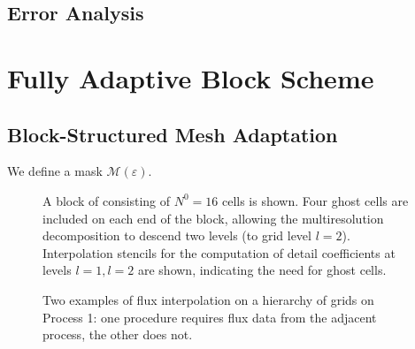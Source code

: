 \documentclass[]{article}
\begin{document}
    \subsection*{Error Analysis}

\section{Fully Adaptive Block Scheme}


    \subsection*{Block-Structured Mesh Adaptation}
    We define a mask $\bm{\mathcal{M}}(\varepsilon)$.

    \begin{figure}[H]
        \center
        
        \caption{A block of consisting of $N^{0} = 16$ cells is shown. Four
        ghost cells are included on each end of the block, allowing the
        multiresolution decomposition to descend two levels (to grid level
        $l=2$). Interpolation stencils for the computation of detail
        coefficients at levels $l=1, l=2$ are shown, indicating the need for ghost cells.}
    \end{figure}
    \begin{figure}[H]
        \center
        
        \caption{}
    \end{figure}


    \begin{figure}[H]
        \center
        
       \caption{Two examples of flux interpolation on a hierarchy of grids
        on Process 1: one procedure requires flux data from the adjacent
        process, the other does not.}
    \end{figure}
\end{document}
